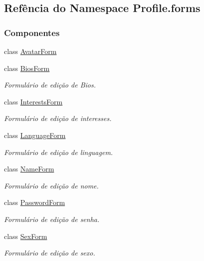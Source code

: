 \hypertarget{namespaceProfile_1_1forms}{}\subsection{Refência do Namespace Profile.\+forms}
\label{namespaceProfile_1_1forms}
\subsubsection*{Componentes}
\begin{DoxyCompactItemize}
\item 
class \hyperlink{classProfile_1_1forms_1_1AvatarForm}{Avatar\+Form}
\item 
class \hyperlink{classProfile_1_1forms_1_1BiosForm}{Bios\+Form}
\begin{DoxyCompactList}\small\item\em Formulário de edição de Bios. \end{DoxyCompactList}\item 
class \hyperlink{classProfile_1_1forms_1_1InterestsForm}{Interests\+Form}
\begin{DoxyCompactList}\small\item\em Formulário de edição de interesses. \end{DoxyCompactList}\item 
class \hyperlink{classProfile_1_1forms_1_1LanguageForm}{Language\+Form}
\begin{DoxyCompactList}\small\item\em Formulário de edição de linguagem. \end{DoxyCompactList}\item 
class \hyperlink{classProfile_1_1forms_1_1NameForm}{Name\+Form}
\begin{DoxyCompactList}\small\item\em Formulário de edição de nome. \end{DoxyCompactList}\item 
class \hyperlink{classProfile_1_1forms_1_1PasswordForm}{Password\+Form}
\begin{DoxyCompactList}\small\item\em Formulário de edição de senha. \end{DoxyCompactList}\item 
class \hyperlink{classProfile_1_1forms_1_1SexForm}{Sex\+Form}
\begin{DoxyCompactList}\small\item\em Formulário de edição de sexo. \end{DoxyCompactList}\end{DoxyCompactItemize}

